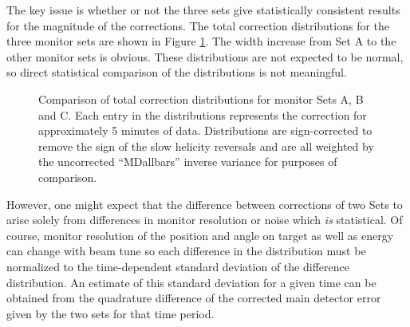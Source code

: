The key issue is whether or not the three sets give statistically consistent results for the magnitude of the corrections. The total correction distributions for the three monitor sets are shown in Figure \ref{fig:correction_distributions}. The width increase from Set A to the other monitor sets is obvious. These distributions are not expected to be normal, so direct statistical comparison of the distributions is not meaningful.
\begin{figure}[ht]

\centering
{}
\caption{Comparison of total correction  distributions for monitor Sets A, B and C. Each entry in the distributions represents the correction for approximately 5 minutes of data. Distributions are sign-corrected to remove the sign of the slow helicity reversals and are all weighted by the uncorrected ``MDallbars'' inverse variance for purposes of comparison.}
\label{fig:correction_distributions}
\end{figure}
 However, one might expect that the difference between corrections of two Sets to arise solely from differences in monitor resolution or noise which {\it is} statistical. Of course, monitor resolution of the position and angle on target as well as energy can change with beam tune so each difference in the distribution must be normalized to the time-dependent standard deviation of the difference distribution. An estimate of this standard deviation for a given time can be obtained from the quadrature difference of the corrected main detector error given by the two sets for that time period.
